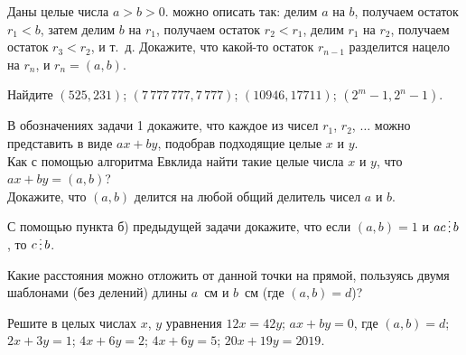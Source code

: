 \documentclass[a4paper,12pt]{article}
\newcommand{\0}[1]{\overline{#1}}
\begin{document}

Даны целые числа $a>b>0$.
 можно описать так: делим $a$ на $b$,
получаем остаток $r_1<b$,
затем делим $b$ на $r_1$,
получаем остаток $r_2<r_1$,
делим $r_1$ на $r_2$,
получаем остаток $r_3<r_2$, и т.~д.
Докажите, что %
какой-то остаток $r_{n-1}$ разделится нацело на $r_n$,
и $r_n=(a,b)$.

 Найдите %
$(525,231)$;
$(7\,777\,777,7\,777)$;
$(10946,17711)$;
$(2^m-1,2^n-1)$.




В обозначениях задачи 1 докажите, что каждое из чисел $r_1$, $r_2$, $\dots$
можно представить в виде $ax+by$, подобрав подходящие целые $x$ и $y$.\\
Как с помощью алгоритма Евклида найти такие целые числа $x$ и $y$,
что $ax+by=(a,b)$?\\
 Докажите, что $(a,b)$ делится на любой
общий делитель чисел $a$ и $b$.

С помощью пункта б) предыдущей задачи докажите, что если $(a,b)=1$ и $ac\del b$, то $c\del b$.

Какие расстояния можно отложить от данной точки на прямой,
пользуясь двумя шаблонами (без делений) длины $a$~см и $b$~см (где $(a,b)=d$)?





Решите в целых числах $x$, $y$ уравнения
$12x=42y$;
$ax+by=0$, где $(a,b)=d$;
 $2x + 3y = 1$;
 $4x + 6y = 2$;
 $4x + 6y = 5$;
 $20x + 19y = 2019$.
\end{document}
